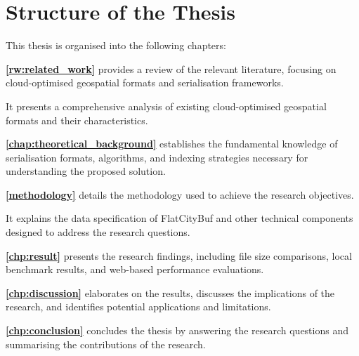 \section{Structure of the Thesis}
\label{introduction:structure_of_the_thesis}

This thesis is organised into the following chapters:

\textbf{\autoref{rw:related_work}} provides a review of the relevant literature, focusing on cloud-optimised geospatial formats and serialisation frameworks.

It presents a comprehensive analysis of existing cloud-optimised geospatial formats and their characteristics.

\textbf{\autoref{chap:theoretical_background}} establishes the fundamental knowledge of serialisation formats, algorithms, and indexing strategies necessary for understanding the proposed solution.

\textbf{\autoref{methodology}} details the methodology used to achieve the research objectives.

It explains the data specification of FlatCityBuf and other technical components designed to address the research questions.

\textbf{\autoref{chp:result}} presents the research findings, including file size comparisons, local benchmark results, and web-based performance evaluations.

\textbf{\autoref{chp:discussion}} elaborates on the results, discusses the implications of the research, and identifies potential applications and limitations.

\textbf{\autoref{chp:conclusion}} concludes the thesis by answering the research questions and summarising the contributions of the research.
